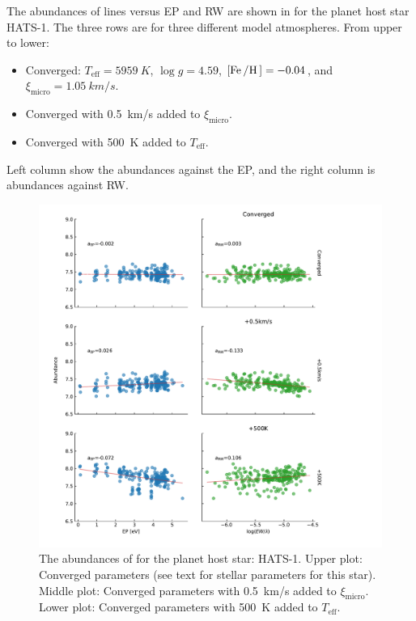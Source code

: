 The abundances of  lines versus EP and RW are shown in  for the planet
host star HATS-1. The three rows are for three different model atmospheres. From upper to lower:
\begin{itemize}
  \item Converged: $T_\mathrm{eff}=\SI{5959}{K}$,
                   $\log g=4.59$,
                   $[\ion{Fe}/\ion{H}]=-0.04$, and
                   $\xi_\mathrm{micro}=\SI{1.05}{km/s}$.
  \item Converged with \SI{0.5}{km/s} added to $\xi_\mathrm{micro}$.
  \item Converged with \SI{500}{K} added to $T_\mathrm{eff}$.
\end{itemize}
Left column show the abundances against the EP, and the right column is
abundances against RW.

\begin{figure}[htpb!]
    \centering
    \includegraphics[width=0.85\linewidth]{figures/EP_RW_vs_abundance.pdf}
    \caption{The abundances of  for the planet host star: HATS-1.
             Upper plot: Converged parameters (see text for stellar parameters for this star).
             Middle plot: Converged parameters with \SI{0.5}{km/s} added to $\xi_\mathrm{micro}$.
             Lower plot: Converged parameters with \SI{500}{K} added to $T_\mathrm{eff}$.}
    \label{fig:eprw}
\end{figure}

